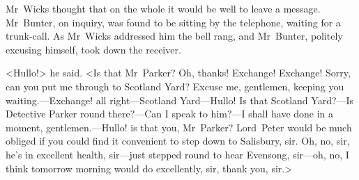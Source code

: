 Mr~Wicks thought that on the whole it would be well to leave a message. Mr~Bunter, on inquiry, was found to be sitting by the telephone, waiting for a trunk-call. As Mr~Wicks addressed him the bell rang, and Mr~Bunter, politely excusing himself, took down the receiver.

<Hullo!> he said. <Is that Mr~Parker? Oh, thanks! Exchange! Exchange! Sorry, can you put me through to Scotland Yard? Excuse me, gentlemen, keeping you waiting.—Exchange! all right—Scotland Yard—Hullo! Is that Scotland Yard?—Is Detective Parker round there?—Can I speak to him?—I shall have done in a moment, gentlemen.—Hullo! is that you, Mr~Parker? Lord~Peter would be much obliged if you could find it convenient to step down to Salisbury, sir. Oh, no, sir, he's in excellent health, sir—just stepped round to hear Evensong, sir—oh, no, I think tomorrow morning would do excellently, sir, thank you, sir.>